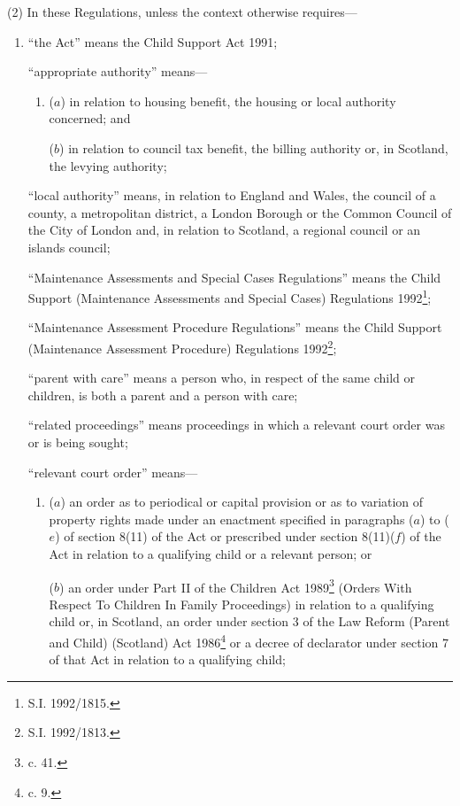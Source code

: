 \documentclass[a4paper,12pt]{article}
\begin{document}
(2) In these Regulations, unless the context otherwise requires—
\begin{enumerate}\item[]
“the Act” means the Child Support Act 1991;

“appropriate authority” means—
\begin{enumerate}\item[]
($a$) in relation to housing benefit, the housing or local authority concerned; and

($b$) in relation to council tax benefit, the billing authority or, in Scotland, the levying authority;
\end{enumerate}

“local authority” means, in relation to England and Wales, the council of a county, a metropolitan district, a London Borough or the Common Council of the City of London and, in relation to Scotland, a regional council or an islands council;

“Maintenance Assessments and Special Cases Regulations” means the Child Support (Maintenance Assessments and Special Cases) Regulations 1992\footnote{\frenchspacing S.I. 1992/1815.};

“Maintenance Assessment Procedure Regulations” means the Child Support (Maintenance Assessment Procedure) Regulations 1992\footnote{\frenchspacing S.I. 1992/1813.};

“parent with care” means a person who, in respect of the same child or children, is both a parent and a person with care;

“related proceedings” means proceedings in which a relevant court order was or is being sought;

“relevant court order” means—
\begin{enumerate}\item[]
($a$) an order as to periodical or capital provision or as to variation of property rights made under an enactment specified in paragraphs ($a$) to ($e$) of section 8(11) of the Act or prescribed under section 8(11)($f$) of the Act in relation to a qualifying child or a relevant person; or

($b$) an order under Part II of the Children Act 1989\footnote{ c. 41.} (Orders With Respect To Children In Family Proceedings) in relation to a qualifying child or, in Scotland, an order under section 3 of the Law Reform (Parent and Child) (Scotland) Act 1986\footnote{ c. 9.} or a decree of declarator under section 7 of that Act in relation to a qualifying child;
\end{enumerate}


\end{enumerate}
\end{document}
